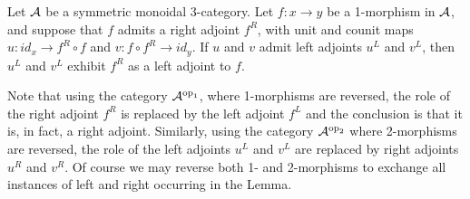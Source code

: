 \documentclass{amsart}
\begin{document}
\begin{lemma} \label{lem-ambiadjoints} 
	Let $\mathcal A$ be a symmetric monoidal 3-category. Let $f: x \to y$ be a 1-morphism in $\mathcal A$, and suppose that $f$ admits a right adjoint $f^R$,  with unit and counit maps $u:id_x \to f^R \circ f$ and $v:f \circ f^R \to id_y$. If $u$ and $v$ admit left adjoints $u^L$ and $v^L$, then $u^L$ and $v^L$ exhibit $f^R$ as a left adjoint to $f$. 
\end{lemma}
\noindent Note that using the category $\mathcal A^{\mathrm{op}_1}$, where 1-morphisms are reversed, the role of the right adjoint $f^R$ is replaced by the left adjoint $f^L$ and the conclusion is that it is, in fact, a right adjoint.  Similarly, using the category $\mathcal A^{\mathrm{op}_2}$ where 2-morphisms are reversed, the role of the left adjoints $u^L$ and $v^L$ are replaced by right adjoints $u^R$ and $v^R$.  Of course we may reverse both 1- and 2-morphisms to exchange all instances of left and right occurring in the Lemma.
\end{document}
